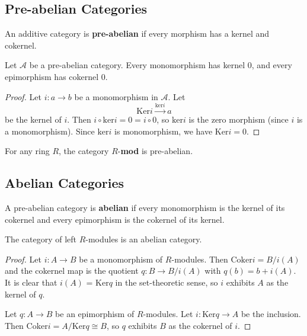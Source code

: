 \subsection{Pre-abelian Categories} %
\label{sub:pre_abelian_categories}
\begin{definition}
   An additive category is \textbf{pre-abelian} if every morphism has a kernel and cokernel.
\end{definition}

\begin{lemma}
  Let $ \mathcal{A} $ be a pre-abelian category. Every monomorphism has kernel $ 0 $, and every epimorphism has cokernel $ 0 $.
\end{lemma}

\begin{proof}
  Let $ i: a \to b $ be a monomorphism in $ \mathcal{A} $. Let
  \begin{equation*}
    \text{Ker}i \xrightarrow{\text{ker}i} a
  \end{equation*}
  be the kernel of $ i $. Then $ i \circ \text{ker}i = 0 = i\circ 0 $, so $ \text{ker}i $ is the zero morphism (since $ i $ is a monomorphism). Since $ \text{ker}i $ is monomorphism, we have $ \text{Ker}i = 0 $.
\end{proof}

\begin{lemma}
  For any ring $ R $, the category $ R $-\textbf{mod} is pre-abelian.
\end{lemma}

\subsection{Abelian Categories} %
\label{sub:abelian_categories}
\begin{definition}
   A pre-abelian category is \textbf{abelian} if every monomorphism is the kernel of its cokernel and every epimorphism is the cokernel of its kernel.
\end{definition}

\begin{lemma}
   The category of left $ R $-modules is an abelian category.
\end{lemma}

\begin{proof}
  Let $ i: A\to B $ be a monomorphism of $ R $-modules. Then $ \text{Coker}i = B/i(A) $ and the cokernel map is the quotient $ q: B \to B/i(A) $ with $ q(b) = b + i(A) $. It is clear that $ i(A) $ = $ \text{Ker}q $ in the set-theoretic sense, so $ i $ exhibits $ A $ as the kernel of $ q $.

  Let $ q: A \to B $ be an epimorphism of $ R $-modules. Let $ i: \text{Ker} q \to A $ be the inclusion. Then $ \text{Coker}i = A/\text{Ker}q \cong B $, so $ q $ exhibits $ B $ as the cokernel of $ i $.
\end{proof}

